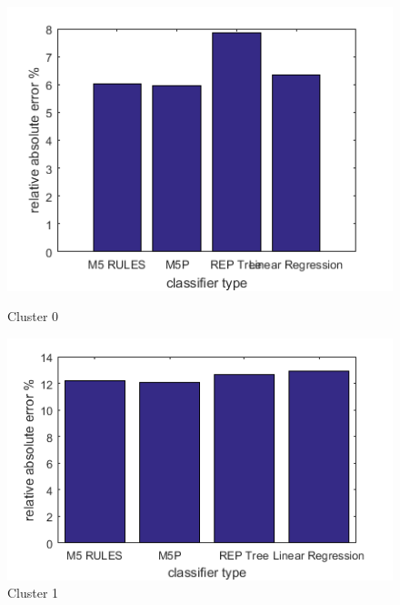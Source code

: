 \begin{figure}
\centering
\begin{minipage}{.5\textwidth}
  \centering
  \includegraphics[width=\linewidth]{cluster-0-diff-classifier-relative-abs.png}
  \caption{Cluster 0}
  \label{fig:cluster-0-predictors}
\end{minipage}%
\begin{minipage}{.5\textwidth}
  \centering
  \includegraphics[width=\linewidth]{cluster-1-diff-classifier-relative-abs.png}
  \caption{Cluster 1}
\label{fig:cluster-1-predictors}
\end{minipage}


\end{figure}
